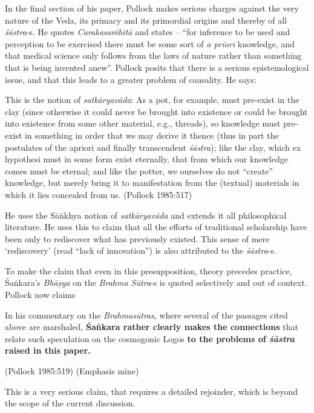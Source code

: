 In the final section of his paper, Pollock makes serious charges against the very nature of the Veda, its primacy and its primordial origins and thereby of all {\sl śāstra}-s. He quotes {\sl Carakasaṁhitā} and states -- ``for inference to be used and perception to be exercised there must be some sort of {\sl a priori} knowledge, and that medical science only follows from the laws of nature rather than something that is being invented anew''. Pollock posits that there is a serious  epistemological issue, and that this leads to a greater problem of causality. He says:
\begin{myquote}
This is the notion of {\sl satkāryavāda}: As a pot, for example, must pre-exist in the clay (since otherwise it could never be brought into existence or could be brought into existence from some other material, e.g., threads), so knowledge must pre-exist in something in order that we may derive it thence (thus in part the postulates of the apriori and finally transcendent {\sl śāstra}); like the clay, which ex hypothesi must in some form exist eternally, that from which our knowledge comes must be eternal; and like the potter, we ourselves do not ``create'' knowledge, but merely bring it to manifestation from the (textual) materials in which it lies concealed from us. 
\hfill	(Pollock 1985:517)
\end{myquote}

He uses the Sāṅkhya notion of {\sl satkāryavāda}  and extends it all philosophical literature. He uses this to claim that all the efforts of traditional scholarship have been only to rediscover what has previously existed. This sense of mere `rediscovery' (read ``lack of innovation'') is also attributed to the {\sl śāstra}-s.

To make the claim that even in this presupposition, theory precedes practice, Śaṅkara's {\sl Bhāṣya} on the {\sl Brahma Sūtra}-s is quoted selectively and out of context. Pollock now claims 
\begin{myquote}
In his commentary on the {\sl Brahmasūtras}, where several of the passages cited above are marshaled, {\bf Śaṅkara rather clearly makes the connections} that relate such speculation on the cosmogonic Logos {\bf to the problems of {{\sl\bfseries śāstra}\relax} raised in this paper.}

\hfill	(Pollock 1985:519) (Emphasis mine)
\end{myquote}

This is a very serious claim, that requires a detailed rejoinder, which is beyond the scope of the current discussion. 


